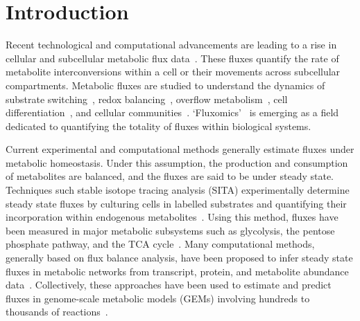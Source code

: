 \documentclass[12pt]{article}
\begin{document}
\clearpage

\section*{Introduction}

Recent technological and computational advancements are leading to a rise
in cellular and subcellular metabolic flux data~\citep{SternAlon2023Imac,LeeWonDong2019Spas,WangLin2022Srit,WangRuohong2022Gstm}.
These fluxes quantify the rate of metabolite interconversions within
a cell or their movements across subcellular compartments. Metabolic
fluxes are studied to understand the dynamics of substrate
switching~\citep{ZampieriMattia2012Rmuc,KochanowskiKarl2021Gcom}, redox
balancing~\citep{McKinlayJamesB2010Cdfa,FranchinaDavideG2022Grbc},
overflow
metabolism~\citep{BasanMarkus2015OmiE,VanderHeidenMatthewG2009UtWE}, cell
differentiation~\citep{EndoYusuke2022Fami,BenjaminJacksonT2024Mrot}, and
cellular
communities~\citep{SchuetzRobert2012MOoM,YuJasonSL2022Mcfr,Gustafsson2024Mcbc}.
`Fluxomics'~\citep{EmwasAbdul-Hamid2022F-NM,SanfordKarl2002Gtfa} is
emerging as a field dedicated to quantifying the totality of fluxes within
biological systems.

Current experimental and computational methods generally estimate fluxes
under metabolic homeostasis. Under this assumption, the production and
consumption of metabolites are balanced, and the fluxes are said to be
under steady state. Techniques such stable isotope tracing analysis (SITA)
experimentally determine steady state fluxes by culturing cells in
labelled substrates and quantifying their incorporation within endogenous
metabolites~\citep{BuescherJoergM2015Arfi,AntoniewiczMaciekR2018Agt1}.
Using this method, fluxes have been measured in major metabolic subsystems
such as glycolysis, the pentose phosphate pathway, and the TCA
cycle~\citep{ZamboniNicola20091mfa,AhnEunyong2017Tfro,WuChao2019FARC}.
Many computational methods, generally based on flux balance analysis, have
been proposed to infer steady state fluxes in metabolic networks from
transcript, protein, and metabolite abundance
data~\citep{UematsuSaori2022Mlmf,GonzalezArrueNicolas2023Peom,HuangYuefan2023Ccmf,KasteJoshuaAM2023Afpu,LeeJustinY2023Tiac}.
Collectively, these approaches have been used to estimate and predict
fluxes in genome-scale metabolic models (GEMs) involving hundreds to
thousands of
reactions~\citep{NilssonAvlant2020Qaoa,CherkaouiSarah2022Afao,GelbachPatrickE2024Fsig}.
\end{document}
